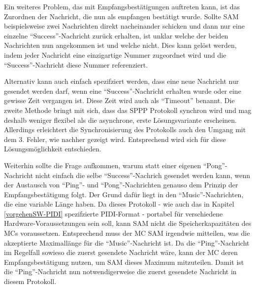 Ein weiteres Problem, das mit Empfangsbestätigungen auftreten kann, ist das Zurordnen der Nachricht, die nun als empfangen bestätigt wurde.
Sollte \ac{SAM} beispielsweise zwei Nachrichten direkt nacheinander schicken und dann nur eine einzelne \enquote{Success}-Nachricht zurück erhalten, ist unklar welche der beiden Nachrichten nun angekommen ist und welche nicht.
Dies kann gelöst werden, indem jeder Nachricht eine einzigartige Nummer zugeordnet wird und die \enquote{Success}-Nachricht diese Nummer referenziert.

Alternativ kann auch einfach spezifziert werden, dass eine neue Nachricht nur gesendet werden darf, wenn eine \enquote{Success}-Nachricht erhalten wurde oder eine gewisse Zeit vergangen ist.
Diese Zeit wird auch als \enquote{Timeout} benannt. %
Die zweite Methode bringt mit sich, dass das \ac{SPPP} Protokoll synchron wird und mag deshalb weniger flexibel als die asynchrone, erste Lösungsvariante erscheinen.
Allerdings erleichtert die Synchronisierung des Protokolls auch den Umgang mit dem 3. Fehler, wie nachher gezeigt wird.
Entsprechend wird sich für diese Lösungsmöglichkeit entschieden.

Weiterhin sollte die Frage aufkommen, warum statt einer eigenen \enquote{Pong}-Nachricht nicht einfach die selbe \enquote{Success}-Nachrich gesendet werden kann, wenn der Austausch von \enquote{Ping}- und \enquote{Pong}-Nachrichten genauso dem Prinzip der Empfangsbestätigung folgt.
Der Grund dafür liegt in den \enquote{Music}-Nachrichten, die eine variable Länge haben.
Da dieses Protokoll - wie auch das in Kapitel \ref{vorgehenSW-PIDI} spezifzierte \ac{PIDI}-Format - portabel für verschiedene Hardware-Voraussetzungen sein soll, kann \ac{SAM} nicht die Speicherkapazitäten des \ac{MC}s voraussetzen.
Entsprechend muss der \ac{MC} \ac{SAM} irgendwie mitteilen, was die akzeptierte Maximallänge für die \enquote{Music}-Nachricht ist.
Da die \enquote{Ping}-Nachricht im Regelfall sowieso die zuerst gesendete Nachricht wäre, kann der \ac{MC} deren Empfangsbestätigung nutzen, um \ac{SAM} dieses Maximum mitzuteilen.
Damit ist die \enquote{Ping}-Nachricht nun notwendigerweise die zuerst gesendete Nachricht in diesem Protokoll.

